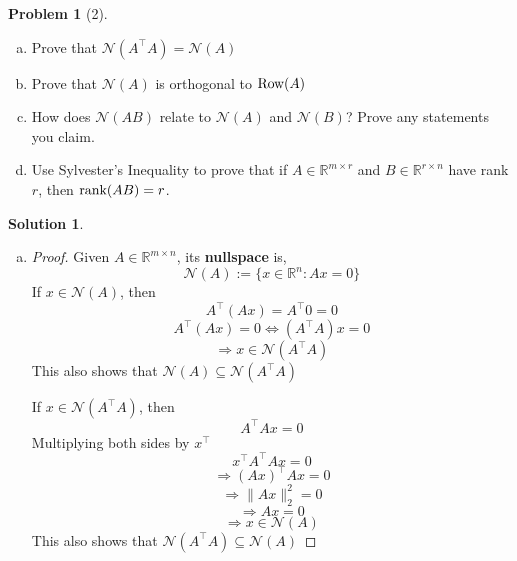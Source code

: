 \documentclass{amsart}[11pt]
\theoremstyle{definition}
\newtheorem*{problem}{Problem}
\newtheorem{solution}{Solution}
\newcommand{\R}{\mathbb{R}}
\providecommand{\norm}[1]{\lVert#1\rVert}
\newcommand{\row}{\textnormal{Row}}
\newcommand{\rank}{\textnormal{rank}}
\begin{document}
\begin{problem}[2]
\begin{enumerate}[(a)]
    \item Prove that $\mathcal{N}(A^\top A)=\mathcal{N}(A)$
    \item Prove that $\mathcal{N}(A)$ is orthogonal to $\row(A)$
    \item How does $\mathcal{N}(AB)$ relate to $\mathcal{N}(A)$ and $\mathcal{N}(B)$? Prove any statements you claim.
    \item Use Sylvester's Inequality to prove that if $A\in\R^{m\times r}$ and $B\in\R^{r\times n}$ have rank $r$, then $\rank(AB)=r$.
\end{enumerate}
\begin{solution}
    \begin{enumerate}[(a)]
        \item \begin{proof}
            Given $A\in\R^{m\times n}$, its \textbf{nullspace} is, 
            \[ \mathcal{N}(A):=\{x\in\R^n:Ax=0\} \]
            If $x\in\mathcal{N}(A)$, then
            \[A^\top(Ax)=A^\top0=0\]
            \[A^\top(Ax)=0\Leftrightarrow (A^\top A)x=0\]
            \[\Rightarrow x\in\mathcal{N}(A^\top A)\]
            This also shows that $\mathcal{N}(A) \subseteq \mathcal{N}(A^\top A)$

            \vspace{\baselineskip}
            \noindent If $x\in\mathcal{N}(A^\top A)$, then
            \[A^\top Ax=0\]
            Multiplying both sides by $x^\top$
            \[x^\top A^\top Ax=0\]
            \[\Rightarrow (Ax)^\top Ax=0\]
            \[\Rightarrow \norm{Ax}_2^2=0\]
            \[\Rightarrow Ax=0\] 
            \[\Rightarrow x\in\mathcal{N}(A)\] 
            This also shows that $\mathcal{N}(A^\top A) \subseteq \mathcal{N}(A) $
            

\end{proof}
\end{enumerate}
\end{solution}
\end{problem}
\end{document}

